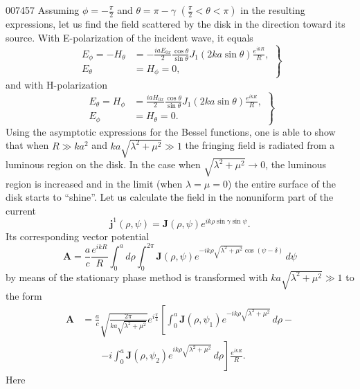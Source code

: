 \begin{scanpage}{0074}{57}
Assuming $\phi=-\frac\pi2$ and $\theta=\pi-\gamma$ $\left(\frac\pi2<\theta<\pi\right)$ in the resulting expressions, let us find the field scattered by the disk in the direction toward its source. With E-polarization of the incident wave, it equals
\[\left.\begin{aligned}E_\phi=-H_\theta&=-\frac{iaE_{0x}}2\frac{\cos\theta}{\sin\theta}J_1(2ka\sin\theta)\frac{e^{ikR}}R,\\E_\theta&=H_\phi=0,\end{aligned}\right\}\tag{10.06}\]
and with H-polarization
\[\left.\begin{aligned}E_\theta=H_\phi&=\frac{iaH_{0x}}2\frac{\cos\theta}{\sin\theta}J_1(2ka\sin\theta)\frac{e^{ikR}}R,\\E_\phi&=H_\theta=0.\end{aligned}\right\}\tag{10.07}\]
Using the asymptotic expressions for the Bessel functions, one is able to show that when $R\gg ka^2$ and $ka\sqrt{\lambda^2+\mu^2}\gg1$ the fringing field is radiated from a luminous region on the disk. In the case when $\sqrt{\lambda^2+\mu^2}\to0$, the luminous region is increased and in the limit (when $\lambda=\mu=0$) the entire surface of the disk starts to ``shine''.
Let us calculate the field in the nonuniform part of the current
\[\mathbf j^1(\rho,\psi)=\mathbf J(\rho,\psi)e^{ik\rho\sin\gamma\sin\psi}.\tag{11.01}\]
Its corresponding vector potential
\[\mathbf A=\frac ac\frac{e^{ikR}}R\int_0^a d\rho\int_0^{2\pi}\mathbf J(\rho,\psi)e^{-ik\rho\sqrt{\lambda^2+\mu^2}\cos(\psi-\delta)}\,d\psi\tag{11.02}\]
by means of the stationary phase method is transformed with $ka\sqrt{\lambda^2+\mu^2}\gg1$ to the form
\[\begin{aligned}\mathbf A&=\frac ac\sqrt{\frac{2\pi}{ka\sqrt{\lambda^2+\mu^2}}}e^{i\frac\pi4}\left[\int_0^a\mathbf J(\rho,\psi_1)e^{-ik\rho\sqrt{\lambda^2+\mu^2}}\,d\rho-\right.\\&\qquad\left.-i\int_0^a\mathbf J(\rho,\psi_2)e^{ik\rho\sqrt{\lambda^2+\mu^2}}\,d\rho\right]\frac{e^{ikR}}R.\end{aligned}\tag{11.03}\]
Here
\end{scanpage}
